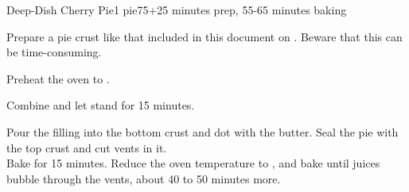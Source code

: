 \documentclass[../Cookbook.tex]{subfiles}
\begin{document}
\begin{recipe}{Deep-Dish Cherry Pie}{1 pie}{75+25 minutes prep, 55-65 minutes baking}

	Prepare a pie crust like that included in this document on . Beware that this can be time-consuming.

	\newstep
	Preheat the oven to .

	Combine and let stand for 15 minutes.

	Pour the filling into the bottom crust and dot with the butter. Seal the pie with the top crust and cut vents in it.\\
	Bake for 15 minutes.
	Reduce the oven temperature to , and bake until juices bubble through the vents, about 40 to 50 minutes more.

\end{recipe}
\end{document}
